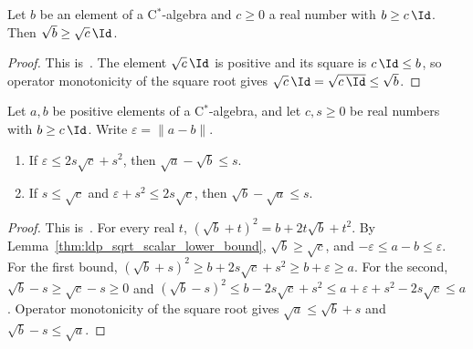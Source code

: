 \begin{lemma}
    \label{thm:ldp_sqrt_scalar_lower_bound}
    \leanok
    Let $b$ be an element of a C$^*$-algebra and $c\ge0$ a real number with
    $b\ge c\,\Id$. Then $\sqrt b\ge\sqrt c\,\Id$.
\end{lemma}
\begin{proof}
    \leanok
    This is~\cite[``Scalar lower bound for the square
        root'']{QICLean2026Blueprint}.
    The element $\sqrt c\,\Id$ is positive and its square is $c\,\Id\le b$, so
    operator monotonicity of the square root gives
    $\sqrt c\,\Id=\sqrt{c\,\Id}\le\sqrt b$.
\end{proof}

\begin{lemma}
    \label{lem:ldp_sqrt_floor_bounds}
    \leanok
    Let $a,b$ be positive elements of a C$^*$-algebra, and let $c,s\ge0$ be
    real numbers with $b\ge c\,\Id$. Write $\varepsilon=\lVert a-b\rVert$.
    \begin{enumerate}
        \item If $\varepsilon\le2s\sqrt c+s^2$, then $\sqrt a-\sqrt b\le s$.
        \item If $s\le\sqrt c$ and $\varepsilon+s^2\le2s\sqrt c$, then
              $\sqrt b-\sqrt a\le s$.
    \end{enumerate}
\end{lemma}
\begin{proof}
    \leanok
    This is~\cite[``One-sided bounds for the square root above a scalar
        floor'']{QICLean2026Blueprint}.
    For every real $t$,
    $(\sqrt b+t)^2=b+2t\sqrt b+t^2$. By
    Lemma~\ref{thm:ldp_sqrt_scalar_lower_bound}, $\sqrt b\ge\sqrt c$, and
    $-\varepsilon\le a-b\le\varepsilon$. For the first bound,
    $(\sqrt b+s)^2\ge b+2s\sqrt c+s^2\ge b+\varepsilon\ge a$. For the second,
    $\sqrt b-s\ge\sqrt c-s\ge0$ and
    $(\sqrt b-s)^2\le b-2s\sqrt c+s^2\le a+\varepsilon+s^2-2s\sqrt c\le a$.
    Operator monotonicity of the square root gives $\sqrt a\le\sqrt b+s$ and
    $\sqrt b-s\le\sqrt a$.
\end{proof}

